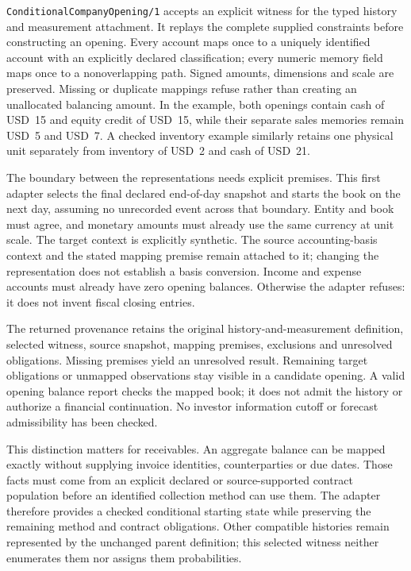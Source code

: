 \texttt{ConditionalCompanyOpening/1} accepts an explicit witness for the
typed history and measurement attachment. It replays the complete supplied
constraints before constructing an opening. Every account maps once to a
uniquely identified account with an explicitly declared classification; every
numeric memory field maps once to a nonoverlapping path. Signed amounts,
dimensions and scale are preserved. Missing or duplicate mappings refuse
rather than creating an unallocated balancing amount. In the example, both
openings contain cash of USD~15 and equity credit of USD~15, while their
separate sales memories remain USD~5 and USD~7. A checked inventory example
similarly retains one physical unit separately from inventory of USD~2 and
cash of USD~21.

The boundary between the representations needs explicit premises. This first
adapter selects the final declared end-of-day snapshot and starts the book
on the next day, assuming no unrecorded event across that boundary. Entity
and book must agree, and monetary amounts must already use the same currency
at unit scale. The target context is explicitly synthetic. The source
accounting-basis context and the stated mapping premise remain attached to
it; changing the representation does not establish a basis conversion.
Income and expense accounts must already have zero opening balances.
Otherwise the adapter refuses: it does not invent fiscal closing entries.

The returned provenance retains the original history-and-measurement
definition, selected witness, source snapshot, mapping premises, exclusions
and unresolved obligations. Missing premises yield an unresolved result.
Remaining target obligations or unmapped observations stay visible in a
candidate opening. A valid opening balance report checks the mapped book;
it does not admit the history or authorize a financial continuation. No
investor information cutoff or forecast admissibility has been checked.

This distinction matters for receivables. An aggregate balance can be mapped
exactly without supplying invoice identities, counterparties or due dates.
Those facts must come from an explicit declared or source-supported contract
population before an identified collection method can use them. The adapter
therefore provides a checked conditional starting state while preserving the
remaining method and contract obligations. Other compatible histories remain
represented by the unchanged parent definition; this selected witness neither
enumerates them nor assigns them probabilities.


